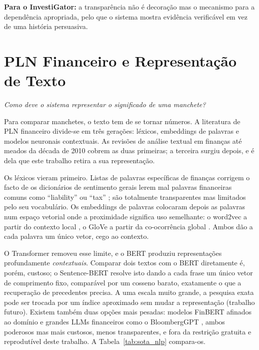 \textbf{Para o InvestiGator:} a transparência não é decoração mas o mecanismo para a dependência
apropriada, pelo que o sistema mostra evidência verificável em vez de uma história persuasiva.

\section{PLN Financeiro e Representação de Texto}
\label{sec:sota_finnlp}

\emph{Como deve o sistema representar o significado de uma manchete?}

Para comparar manchetes, o texto tem de se tornar números. A literatura de PLN financeiro divide-se em
três gerações: léxicos, embeddings de palavras e modelos neuronais contextuais. As revisões de análise
textual em finanças até meados da década de 2010 \autocite{kearney2014textual} cobrem as duas primeiras;
a terceira surgiu depois, e é dela que este trabalho retira a sua representação.

Os léxicos vieram primeiro. Listas de palavras específicas de finanças corrigem o facto de os dicionários
de sentimento gerais lerem mal palavras financeiras comuns como ``liability'' ou ``tax''
\autocite{loughran2011liability}; são totalmente transparentes mas limitados pelo seu vocabulário. Os
embeddings de palavras colocaram depois as palavras num espaço vetorial onde a proximidade significa uso
semelhante: o word2vec a partir do contexto local \autocite{mikolov2013word2vec}, o GloVe a partir da
co-ocorrência global \autocite{pennington2014glove}. Ambos dão a cada palavra um único vetor, cego ao
contexto.

O Transformer \autocite{vaswani2017attention} removeu esse limite, e o BERT \autocite{devlin2019bert}
produziu representações profundamente \emph{contextuais}. Comparar dois textos com o BERT diretamente é,
porém, custoso; o Sentence-BERT \autocite{reimers2019sbert} resolve isto dando a cada frase um único vetor
de comprimento fixo, comparável por um cosseno barato, exatamente o que a recuperação de precedentes
precisa. A uma escala muito grande, a pesquisa exata pode ser trocada por um índice aproximado
\autocite{johnson2021faiss} sem mudar a representação (trabalho futuro). Existem também duas opções mais
pesadas: modelos FinBERT afinados ao domínio \autocite{araci2019finbert, yang2020finbert} e grandes LLMs
financeiros como o BloombergGPT \autocite{wu2023bloomberggpt}, ambos poderosos mas mais custosos, menos
transparentes, e fora da restrição gratuita e reprodutível deste trabalho. A Tabela~\ref{tab:sota_nlp}
compara-os.

